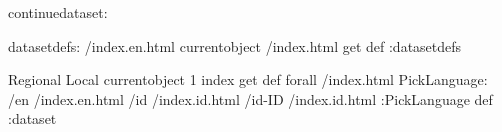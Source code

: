 \begin{ingrid}
continuedataset:

datasetdefs:
/index.en.html currentobject /index.html get def
:datasetdefs

{ Regional Local } { currentobject 1 index get def } forall
/index.html {
PickLanguage:
/en /index.en.html
/id /index.id.html
/id-ID /index.id.html
:PickLanguage
} def
:dataset
\end{ingrid}
